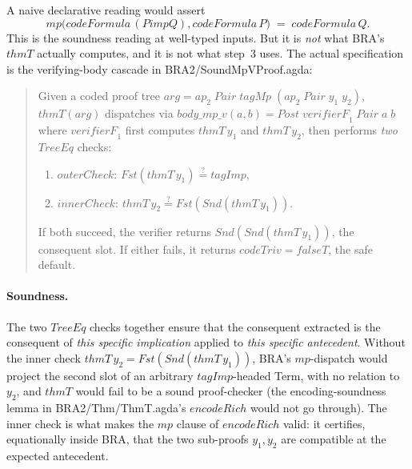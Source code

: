 \documentclass[11pt]{article}
\begin{document}
A naive declarative reading would assert
\[
  \mathit{mp}\big(\mathit{codeFormula}\,(P \mathrel{\mathit{imp}} Q),
                  \mathit{codeFormula}\,P\big)
   \;=\; \mathit{codeFormula}\,Q.
\]
This is the soundness reading at well-typed inputs.  But it is
\emph{not} what BRA's $\mathit{thmT}$ actually computes, and it is
not what step~3 uses.  The actual specification is the
verifying-body cascade in BRA2/SoundMpVProof.agda:

\begin{quote}
  Given a coded proof tree
  $\mathit{arg} = \mathit{ap}_2\;\mathit{Pair}\;\mathit{tagMp}\;
   (\mathit{ap}_2\;\mathit{Pair}\;y_1\;y_2)$,
  $\mathit{thmT}(\mathit{arg})$ dispatches via
  $\mathit{body\_mp\_v}(a, b) = \mathit{Post}\;\mathit{verifierF}_1\;\mathit{Pair}\;a\;b$
  where $\mathit{verifierF}_1$ first computes
  $\mathit{thmT}\,y_1$ and $\mathit{thmT}\,y_2$, then performs
  \emph{two} $\mathit{TreeEq}$ checks:
  \begin{enumerate}
    \item $\mathit{outerCheck}$:
          $\mathit{Fst}(\mathit{thmT}\,y_1) \stackrel{?}{=} \mathit{tagImp}$,
    \item $\mathit{innerCheck}$:
          $\mathit{thmT}\,y_2 \stackrel{?}{=} \mathit{Fst}(\mathit{Snd}(\mathit{thmT}\,y_1))$.
  \end{enumerate}
  If both succeed, the verifier returns $\mathit{Snd}(\mathit{Snd}
  (\mathit{thmT}\,y_1))$, the consequent slot.  If either fails, it
  returns $\mathit{codeTriv} = \mathit{falseT}$, the safe default.
\end{quote}

\paragraph{Soundness.}  The two $\mathit{TreeEq}$ checks together
ensure that the consequent extracted is the consequent of \emph{this
specific implication} applied to \emph{this specific antecedent}.
Without the inner check $\mathit{thmT}\,y_2 = \mathit{Fst}(\mathit{Snd}
(\mathit{thmT}\,y_1))$, BRA's $\mathit{mp}$-dispatch would project
the second slot of an arbitrary $\mathit{tagImp}$-headed Term, with
no relation to $y_2$, and $\mathit{thmT}$ would fail to be a sound
proof-checker (the encoding-soundness lemma in
BRA2/Thm/ThmT.agda's $\mathit{encodeRich}$ would not go through).
The inner check is what makes the $\mathit{mp}$ clause of
$\mathit{encodeRich}$ valid: it certifies, equationally inside BRA,
that the two sub-proofs $y_1, y_2$ are compatible at the
expected antecedent.
\end{document}
